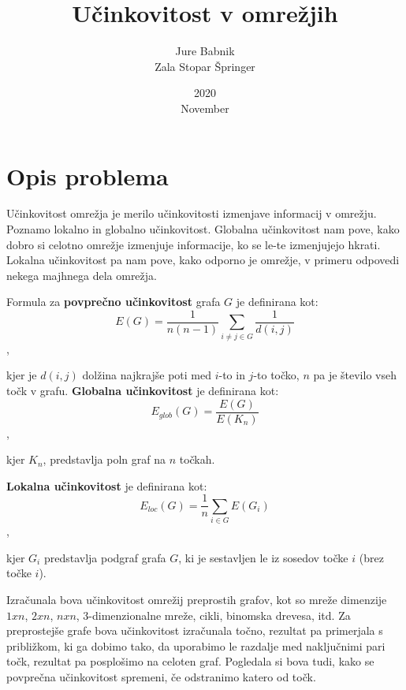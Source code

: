 \documentclass[a4paper, 16pt]{article}
\title{Učinkovitost v omrežjih}
\date{2020\\ November}
\author{Jure Babnik \\  Zala Stopar Špringer}
\begin{document}
\maketitle

\section{Opis problema}

Učinkovitost omrežja je merilo učinkovitosti izmenjave informacij v omrežju. Poznamo lokalno in globalno učinkovitost. Globalna učinkovitost nam pove, kako dobro si celotno omrežje
izmenjuje informacije, ko se le-te izmenjujejo hkrati. Lokalna učinkovitost pa nam pove, kako odporno je omrežje, v primeru odpovedi nekega majhnega dela omrežja.\n

Formula za \textbf{povprečno učinkovitost} grafa $G$ je definirana kot:
$$ E(G) = \frac{1}{n(n-1)} \sum_{i\neq j \in G} \frac{1}{d(i,j)}$$,

kjer je $d(i,j)$ dolžina najkrajše poti med $i$-to in $j$-to točko, $n$ pa je število vseh točk v grafu.\n
\textbf{Globalna učinkovitost} je definirana kot:
$$ E_{glob}(G) = \frac{E(G)}{E(K_n)} $$,

kjer $K_n$, predstavlja poln graf na $n$ točkah.

\textbf{Lokalna učinkovitost} je definirana kot:
$$ E_{loc}(G) = \frac{1}{n} \sum_{i \in G} E(G_i) $$,

kjer $G_i$ predstavlja podgraf grafa $G$, ki je sestavljen le iz sosedov točke $i$ (brez točke $i$).\n

Izračunala bova učinkovitost omrežij preprostih grafov, kot so mreže dimenzije $1 x n$, $2 x n$, $n x n$, 3-dimenzionalne mreže, cikli, binomska drevesa, itd.
Za preprostejše grafe bova učinkovitost izračunala točno, rezultat pa primerjala s približkom, ki ga dobimo tako, da uporabimo le razdalje med naključnimi pari točk, 
rezultat pa posplošimo na celoten graf. Pogledala si bova tudi, kako se povprečna učinkovitost spremeni, če odstranimo katero od točk. 
\end{document}

